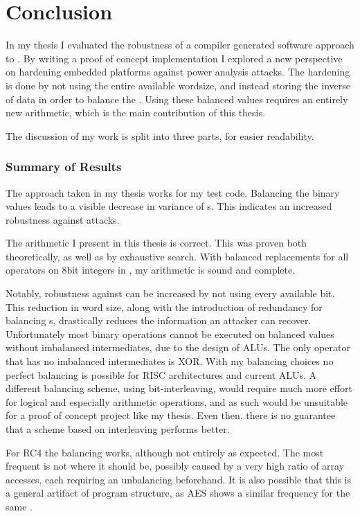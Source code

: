\section{Conclusion}
\label{conclusion}
In my thesis I evaluated the robustness of a compiler generated software approach to \dual{}.
By writing a proof of concept implementation I explored a new perspective on hardening embedded platforms against power analysis attacks.
The hardening is done by not using the entire available wordsize, and instead storing the inverse of data in order to balance the \hammingw{}.
Using these balanced values requires an entirely new arithmetic, which is the main contribution of this thesis.

The discussion of my work is split into three parts, for easier readability.

\subsubsection{Summary of Results}
The approach taken in my thesis works for my test code.
Balancing the binary values leads to a visible decrease in variance of \hammingw{}s.
This indicates an increased robustness against \poweranalysis{} attacks.

The arithmetic I present in this thesis is correct.
This was proven both theoretically, as well as by exhaustive search.
With balanced replacements for all operators on 8bit integers in \ir{}, my arithmetic is sound and complete.

Notably, robustness against \poweranalysis{} can be increased by not using every available bit.
This reduction in word size, along with the introduction of redundancy for balancing \hammingw{}s, drastically reduces the information an attacker can recover.
Unfortunately most binary operations cannot be executed on balanced values without imbalanced intermediates, due to the design of ALUs.
The only operator that has no imbalanced intermediates is XOR.
With my balancing choices no perfect balancing is possible for RISC architectures and current ALUs.
A different balancing scheme, using bit-interleaving, would require much more effort for logical and especially arithmetic operations, and as such would be unsuitable for a proof of concept project like my thesis.
Even then, there is no guarantee that a scheme based on interleaving performs better.

For RC4 the balancing works, although not entirely as expected.
The most frequent \hammingw{} is not where it should be, possibly caused by a very high ratio of array accesses, each requiring an unbalancing beforehand.
It is also possible that this is a general artifact of program structure, as AES shows a similar frequency for the same \hammingw{}.

